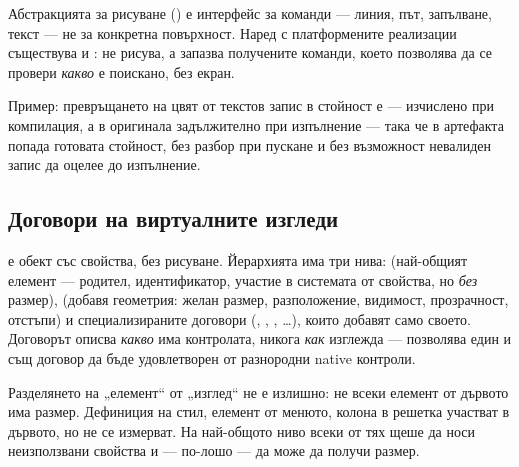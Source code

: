 Абстракцията за рисуване () е интерфейс за команди --- линия, път, запълване,
текст --- не за конкретна повърхност. Наред с платформените реализации съществува и
: не рисува, а запазва получените команди, което позволява да се провери
\emph{какво} е поискано, без екран.

Пример: превръщането на цвят от текстов запис в стойност е  --- изчислено
при компилация, а в оригинала задължително при изпълнение --- така че в артефакта попада
готовата стойност, без разбор при пускане и без възможност невалиден запис да оцелее до
изпълнение.

\subsection{Договори на виртуалните изгледи}
\label{subsec:contracts}

 е обект със свойства, без рисуване. Йерархията има три нива:
 (най-общият елемент --- родител, идентификатор, участие в системата от
свойства, но \emph{без} размер),  (добавя геометрия: желан размер,
разположение, видимост, прозрачност, отстъпи) и специализираните договори
(, , , …), които добавят само своето.
Договорът описва \emph{какво} има контролата, никога \emph{как} изглежда --- позволява
един и същ договор да бъде удовлетворен от разнородни native контроли.

Разделянето на „елемент“ от „изглед“ не е излишно: не всеки елемент от дървото има размер.
Дефиниция на стил, елемент от менюто, колона в решетка участват в дървото, но не се
измерват. На най-общото ниво всеки от тях щеше да носи неизползвани свойства и --- по-лошо
--- да може да получи размер.

